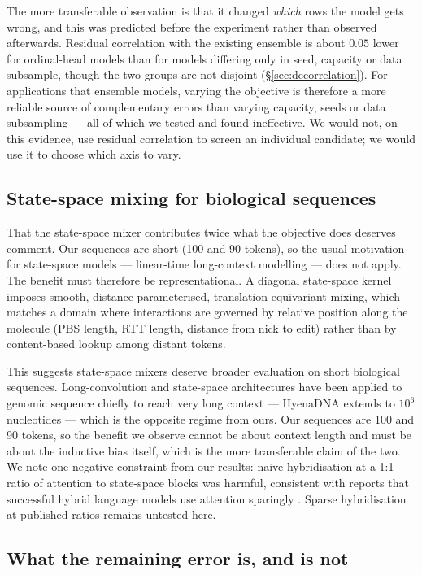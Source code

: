 \documentclass[11pt]{article}
\begin{document}
The more transferable observation is that it changed \emph{which} rows the model gets
wrong, and this was predicted before the experiment rather than observed afterwards.
Residual correlation with the existing ensemble is about $0.05$ lower for ordinal-head
models than for models differing only in seed, capacity or data subsample, though the
two groups are not disjoint (\S\ref{sec:decorrelation}). For applications that ensemble
models, varying the objective is therefore a more reliable source of complementary
errors than varying capacity, seeds or data subsampling --- all of which we tested and
found ineffective. We would not, on this evidence, use residual correlation to screen an
individual candidate; we would use it to choose which axis to vary.

\subsection{State-space mixing for biological sequences}

That the state-space mixer contributes twice what the objective does deserves comment.
Our sequences are short (100 and 90 tokens), so the usual motivation for state-space
models --- linear-time long-context modelling \citep{gu2022s4,gu2023mamba} --- does not
apply. The benefit must therefore be representational. A diagonal state-space kernel
imposes smooth, distance-parameterised, translation-equivariant mixing, which matches a
domain where interactions are governed by relative position along the molecule
(PBS length, RTT length, distance from nick to edit) rather than by content-based
lookup among distant tokens.

This suggests state-space mixers deserve broader evaluation on short biological
sequences. Long-convolution and state-space architectures have been applied to genomic
sequence chiefly to reach very long context --- HyenaDNA extends to $10^6$ nucleotides
\citep{nguyen2023} --- which is the opposite regime from ours. Our sequences are 100 and
90 tokens, so the benefit we observe cannot be about context length and must be about
the inductive bias itself, which is the more transferable claim of the two. We note one negative constraint from our results: naive
hybridisation at a 1:1 ratio of attention to state-space blocks was harmful, consistent
with reports that successful hybrid language models use attention sparingly
\citep{lieber2024jamba}. Sparse hybridisation at published ratios remains untested here.

\subsection{What the remaining error is, and is not}
\end{document}
